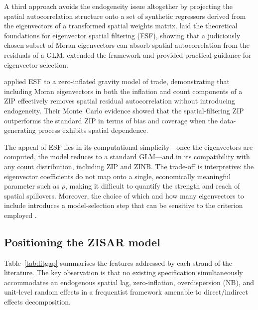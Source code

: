 A third approach avoids the endogeneity issue altogether by projecting the spatial autocorrelation structure onto a set of synthetic regressors derived from the eigenvectors of a transformed spatial weights matrix.
\citet{griffith2003} laid the theoretical foundations for eigenvector spatial filtering (ESF), showing that a judiciously chosen subset of Moran eigenvectors can absorb spatial autocorrelation from the residuals of a GLM.
\citet{griffith_chun2014} extended the framework and provided practical guidance for eigenvector selection.

\citet{metulini2018} applied ESF to a zero-inflated gravity model of trade, demonstrating that including Moran eigenvectors in both the inflation and count components of a ZIP effectively removes spatial residual autocorrelation without introducing endogeneity.
Their Monte~Carlo evidence showed that the spatial-filtering ZIP outperforms the standard ZIP in terms of bias and coverage when the data-generating process exhibits spatial dependence.

The appeal of ESF lies in its computational simplicity---once the eigenvectors are computed, the model reduces to a standard GLM---and in its compatibility with any count distribution, including ZIP and ZINB.
The trade-off is interpretive: the eigenvector coefficients do not map onto a single, economically meaningful parameter such as $\rho$, making it difficult to quantify the strength and reach of spatial spillovers.
Moreover, the choice of which and how many eigenvectors to include introduces a model-selection step that can be sensitive to the criterion employed \citep{griffith_chun2014}.

\subsection{Positioning the ZISAR model}\label{sec:lit_gap}

Table~\ref{tab:litgap} summarises the features addressed by each strand of the literature.
The key observation is that no existing specification simultaneously accommodates an endogenous spatial lag, zero-inflation, overdispersion (NB), and unit-level random effects in a frequentist framework amenable to direct/indirect effects decomposition.

